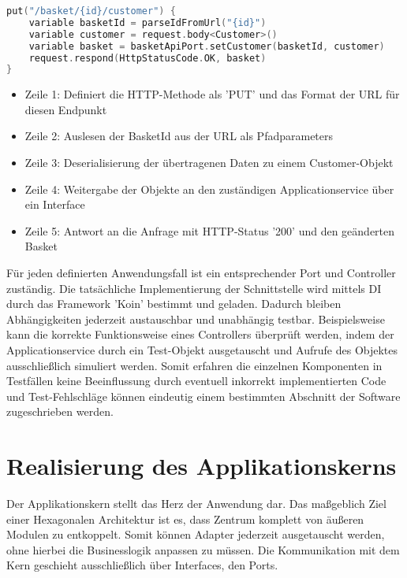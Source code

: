 \begin{minipage}{\linewidth} %
\begin{lstlisting}[caption={Beispiel eines Controllers zum aktualiseren von Kundendaten}, label={lst:controller}, language=Kotlin]
put("/basket/{id}/customer") { 
	variable basketId = parseIdFromUrl("{id}")
	variable customer = request.body<Customer>()  
	variable basket = basketApiPort.setCustomer(basketId, customer)
	request.respond(HttpStatusCode.OK, basket)
}
\end{lstlisting}
\end{minipage}

\begin{itemize}[noitemsep,nolistsep]
	\item Zeile 1: Definiert die HTTP-Methode als 'PUT' und das Format der URL für diesen Endpunkt
	\item Zeile 2: Auslesen der BasketId aus der URL als Pfadparameters 
	\item Zeile 3: Deserialisierung der übertragenen Daten zu einem Customer-Objekt
	\item Zeile 4: Weitergabe der Objekte an den zuständigen Applicationservice über ein Interface
	\item Zeile 5: Antwort an die Anfrage mit HTTP-Status '200' und den geänderten Basket
\end{itemize}

Für jeden definierten Anwendungsfall ist ein entsprechender Port und Controller zuständig. Die tatsächliche Implementierung der Schnittstelle wird mittels \Gls{DI} durch das Framework 'Koin' bestimmt und geladen. Dadurch bleiben Abhängigkeiten jederzeit austauschbar und unabhängig testbar. Beispielsweise kann die korrekte Funktionsweise eines Controllers überprüft werden, indem der Applicationservice durch ein Test-Objekt ausgetauscht und Aufrufe des Objektes ausschließlich simuliert werden. Somit erfahren die einzelnen Komponenten in Testfällen keine Beeinflussung durch eventuell inkorrekt implementierten Code und Test-Fehlschläge können eindeutig einem bestimmten Abschnitt der Software zugeschrieben werden.

\section{Realisierung des Applikationskerns}

Der Applikationskern stellt das Herz der Anwendung dar. Das maßgeblich Ziel einer Hexagonalen Architektur ist es, dass Zentrum komplett von äußeren Modulen zu entkoppelt. Somit können Adapter jederzeit ausgetauscht werden, ohne hierbei die Businesslogik anpassen zu müssen. Die Kommunikation mit dem Kern geschieht ausschließlich über Interfaces, den Ports.

